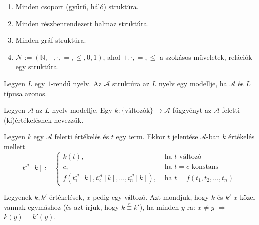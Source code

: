 \begin{exmpl}
\begin{minipage}[t]{\linewidth}
\begin{enumerate}
\item Minden csoport (gyűrű, háló) struktúra.
\item Minden részbenrendezett halmaz struktúra.
\item Minden gráf struktúra.
\item $\mathcal{N} := ( \mathbb{N}, +, \cdot, =, \leqslant, 0,1)$, ahol $+,\cdot, =, \leqslant$ a szokásos műveletek, relációk egy struktúra.
\end{enumerate}
\end{minipage}
\end{exmpl}

\begin{defi} Legyen $L$ egy $1$-rendű nyelv. Az $\mathcal{A}$ struktúra az $L$ nyelv egy modellje, ha $\mathcal{A}$ és $L$ típusa azonos.
\end{defi}
\begin{defi}Legyen $\mathcal{A}$ az $L$ nyelv modellje. Egy $k: \lbrace \text{változók} \rbrace \rightarrow \mathcal{A}$ függvényt az $\mathcal{A}$ feletti (ki)értékelésnek nevezzük.
\end{defi}
\begin{defi} Legyen $k$ egy $\mathcal{A}$ feletti értékelés és $t$ egy term. Ekkor $t$ jelentése $\mathcal{A}$-ban $k$ értékelés mellett
$$t^\mathcal{A}[k] := 
\begin{cases}
k(t), & \text{ ha $t$ változó} \\
c, & \text{ ha $t=c$ konstans} \\
f(t^{\mathcal{A}}_1[k], t^{\mathcal{A}}_2[k], \ldots, t^{\mathcal{A}}_n[k]), & \text{ ha $t = f(t_1, t_2, \ldots, t_n)$}
\end{cases}
$$
\end{defi}
\begin{defi} Legyenek $k, k'$ értékelések, $x$ pedig egy változó. Azt mondjuk, hogy $k$ és $k'$ $x$-közel vannak egymáshoz (és azt írjuk, hogy $k \stackrel{x}{\equiv} k'$), ha minden $y$-ra: $x \neq y$ $\Rightarrow$ $k(y)=k'(y)$.
\end{defi}
